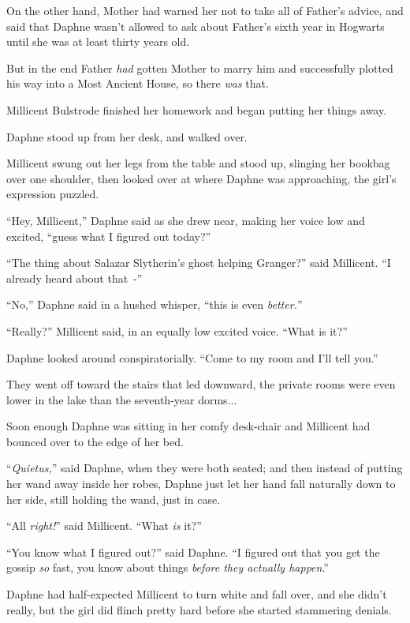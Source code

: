 On the other hand, Mother had warned her not to take all of Father's advice, and said that Daphne wasn't allowed to ask about Father's sixth year in Hogwarts until she was at least thirty years old.

But in the end Father \emph{had} gotten Mother to marry him and successfully plotted his way into a Most Ancient House, so there \emph{was} that.

Millicent Bulstrode finished her homework and began putting her things away.

Daphne stood up from her desk, and walked over.

Millicent swung out her legs from the table and stood up, slinging her bookbag over one shoulder, then looked over at where Daphne was approaching, the girl's expression puzzled.

``Hey, Millicent,'' Daphne said as she drew near, making her voice low and excited, ``guess what I figured out today?''

``The thing about Salazar Slytherin's ghost helping Granger?'' said Millicent. ``I already heard about that~-''

``No,'' Daphne said in a hushed whisper, ``this is even \emph{better.}''

``Really?'' Millicent said, in an equally low excited voice. ``What is it?''

Daphne looked around conspiratorially. ``Come to my room and I'll tell you.''

They went off toward the stairs that led downward, the private rooms were even lower in the lake than the seventh-year dorms...

Soon enough Daphne was sitting in her comfy desk-chair and Millicent had bounced over to the edge of her bed.

``\emph{Quietus,}'' said Daphne, when they were both seated; and then instead of putting her wand away inside her robes, Daphne just let her hand fall naturally down to her side, still holding the wand, just in case.

``All \emph{right!}'' said Millicent. ``What \emph{is} it?''

``You know what I figured out?'' said Daphne. ``I figured out that you get the gossip \emph{so} fast, you know about things \emph{before they actually happen}.''

Daphne had half-expected Millicent to turn white and fall over, and she didn't really, but the girl did flinch pretty hard before she started stammering denials.

